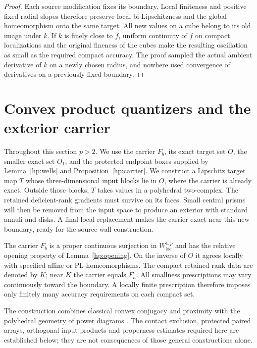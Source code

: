 \documentclass[11pt]{article}
\numberwithin{equation}{section}
\theoremstyle{definition}
\theoremstyle{remark}
\begin{document}
\begin{proof}
Each source modification fixes its boundary.  Local finiteness and
positive fixed radial slopes therefore preserve local
bi-Lipschitzness and the global homeomorphism onto the same target.
All new values on a cube belong to its old image under $k$.  If
$k$ is finely close to $f$, uniform continuity of $f$ on compact
localizations and the original fineness of the cubes make the
resulting oscillation as small as the required compact accuracy.
The proof sampled the actual ambient derivative of $k$ on a newly
chosen radius, and nowhere used convergence of derivatives on a
previously fixed boundary.
\end{proof}

\section{Convex product quantizers and the exterior carrier}\label{sec:quantizers}

Throughout this section $p>2$.  We use the carrier
$F_b$, its exact target set $O$, the smaller exact set $O_1$, and the
protected endpoint boxes supplied by Lemma~\ref{hp:wells} and
Proposition~\ref{hp:carrier}.  We construct a Lipschitz target map $T$
whose three-dimensional input
blocks lie in $O$, where the carrier is already exact.  Outside those
blocks, $T$ takes values in a polyhedral two-complex.  The retained
deficient-rank gradients must survive on its faces.  Small central
prisms will then be removed from the input space to produce an exterior
with standard annuli and disks.  A final local replacement makes the
carrier exact near this new boundary, ready for the source-wall
construction.

The carrier $F_b$ is a proper continuous surjection in
$W^{1,p}_{\mathrm{loc}}$ and has the relative opening property of
Lemma~\ref{hp:opening}.  On the inverse of $O$ it agrees locally with
specified affine or PL homeomorphisms.  The compact retained rank data
are denoted by $K$; near $K$ the carrier equals $F_\kappa$.  All
smallness prescriptions may vary continuously toward the boundary.
A locally finite prescription therefore imposes only finitely many
accuracy requirements on each compact set.

The construction combines classical convex conjugacy and proximity
\cite{Moreau1965} with the polyhedral geometry of power diagrams
\cite{Aurenhammer1987}.  The contact exclusion, protected paired
arrays, orthogonal input products and properness estimates required
here are established below; they are not consequences of those
general constructions alone.
\end{document}
